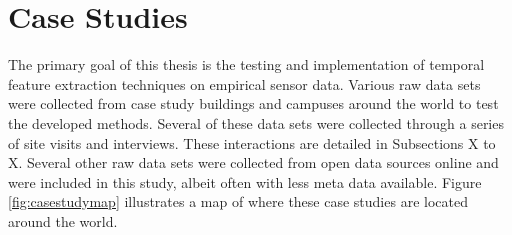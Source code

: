 \section{Case Studies}
\label{sec:casestudies}

The primary goal of this thesis is the testing and implementation of temporal feature extraction techniques on empirical sensor data. Various raw data sets were collected from case study buildings and campuses around the world to test the developed methods. Several of these data sets were collected through a series of site visits and interviews. These interactions are detailed in Subsections X to X. Several other raw data sets were collected from open data sources online and were included in this study, albeit often with less meta data available. Figure \ref{fig:casestudymap} illustrates a map of where these case studies are located around the world.